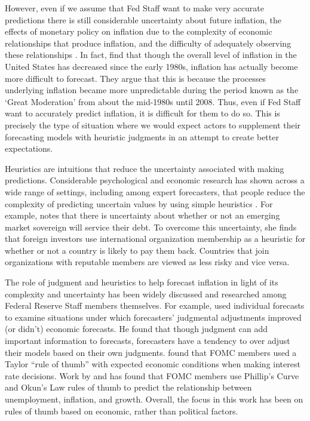\documentclass[a4paper]{article}
\begin{document}
However, even if we assume that Fed Staff want to make very accurate predictions there is still considerable uncertainty about future inflation, the effects of monetary policy on inflation due to the complexity of economic relationships that produce inflation, and the difficulty of adequately observing these relationships \cite[see][22-24]{Schonhardt2013}. In fact, \cite{Gamber2009} find that though the overall level of inflation in the United States has decreased since the early 1980s, inflation has actually become more difficult to forecast. They argue that this is because the processes underlying inflation became more unpredictable during the period known as the `Great Moderation' from about the mid-1980s until 2008. Thus, even if Fed Staff want to accurately predict inflation, it is difficult for them to do so. This is precisely the type of situation where we would expect actors to supplement their forecasting models with heuristic judgments in an attempt to create better expectations.

Heuristics are intuitions that reduce the uncertainty associated with making predictions. Considerable psychological and economic research has shown across a wide range of settings, including among expert forecasters, that people reduce the complexity of predicting uncertain values by using simple heuristics \citep[see][]{kahneman1973,tverskykahneman1974,Tversky1983,Kahneman2002,kahneman2003}. For example, \cite{Gray2013} notes that there is uncertainty about whether or not an emerging market sovereign will service their debt. To overcome this uncertainty, she finds that foreign investors use international organization membership as a heuristic for whether or not a country is likely to pay them back. Countries that join organizations with reputable members are viewed as less risky and vice versa.

The role of judgment and heuristics to help forecast inflation in light of its complexity and uncertainty has been widely discussed and researched among Federal Reserve Staff members themselves. For example, \cite{McNees1990} used individual forecasts to examine situations under which forecasters' judgmental adjustments improved (or didn't) economic forecasts. He found that though judgment can add important information to forecasts, forecasters have a tendency to over adjust their models based on their own judgments. \cite{Orphanides2008} found that FOMC members used a Taylor ``rule of thumb'' with expected economic conditions when making interest rate decisions. Work by \cite{Tillmann2010Philips} and \cite{KnotekII2007} has found that FOMC members use Phillip's Curve and Okun's Law rules of thumb to predict the relationship between unemployment, inflation, and growth. Overall, the focus in this work has been on rules of thumb based on economic, rather than political factors.
\end{document}
